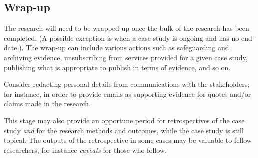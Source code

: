 \subsection{Wrap-up}
The research will need to be wrapped up once the bulk of the research has been completed. (A possible exception is when a case study is ongoing and has no end-date.). The wrap-up can include various actions such as safeguarding and archiving evidence, unsubscribing from services provided for a given case study, publishing what is appropriate to publish in terms of evidence, and so on.

Consider redacting personal details from communications with the stakeholders; for instance, in order to provide emails as supporting evidence for quotes and/or claims made in the research. 

This stage may also provide an opportune period for retrospectives of the case study \textit{and} for the research methods and outcomes, while the case study is still topical. The outputs of the retrospective in some cases may be valuable to fellow researchers, for instance \emph{caveats} for those who follow. 

